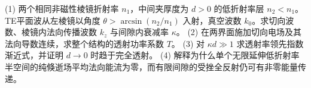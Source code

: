 (1) 两个相同非磁性棱镜折射率 \(n_1\)，中间夹厚度为 \(d>0\) 的低折射率层 \(n_2<n_1\)。TE平面波从左棱镜以角度 \(\theta>\arcsin(n_2/n_1)\) 入射，真空波数 \(k_0\)。求切向波数、棱镜内法向传播波数 \(k_z\) 与间隙内衰减率 \(\kappa\)。
(2) 在两界面施加切向电场及其法向导数连续，求整个结构的透射功率系数 \(T\)。
(3) 对 \(\kappa d\gg1\) 求透射率领先指数渐近式，并证明 \(d\to0\) 时趋于完全透射。
(4) 解释为什么单个无限延伸低折射率半空间的纯倏逝场平均法向能流为零，而有限间隙的受挫全反射仍可有非零能量传递。

